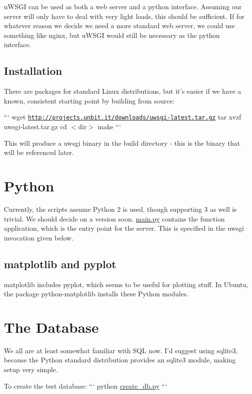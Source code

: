u\-W\-S\-G\-I can be used as both a web server and a python interface. Assuming our server will only have to deal with very light loads, this should be sufficient. If for whatever reason we decide we need a more standard web server, we could use something like nginx, but u\-W\-S\-G\-I would still be necessary as the python interface.

\subsection*{Installation}

There are packages for standard Linux distributions, but it's easier if we have a known, consistent starting point by building from source\-:

``` wget \href{http://projects.unbit.it/downloads/uwsgi-latest.tar.gz}{\tt http\-://projects.\-unbit.\-it/downloads/uwsgi-\/latest.\-tar.\-gz} tar xvzf uwsgi-\/latest.\-tar.\-gz cd $<$dir$>$ make ```

This will produce a uwsgi binary in the build directory -\/ this is the binary that will be referenced later.

\section*{Python}

Currently, the scripts assume Python 2 is used, though supporting 3 as well is trivial. We should decide on a version soon. \hyperlink{main_8py}{main.\-py} contains the function application, which is the entry point for the server. This is specified in the uwsgi invocation given below.

\subsection*{matplotlib and pyplot}

matplotlib includes pyplot, which seems to be useful for plotting stuff. In Ubuntu, the package python-\/matplotlib installs these Python modules.

\section*{The Database}

We all are at least somewhat familiar with S\-Q\-L now. I'd suggest using sqlite3, because the Python standard distribution provides an sqlite3 module, making setup very simple.

To create the test database\-: ``` python \hyperlink{create__db_8py}{create\-\_\-db.\-py} ```

